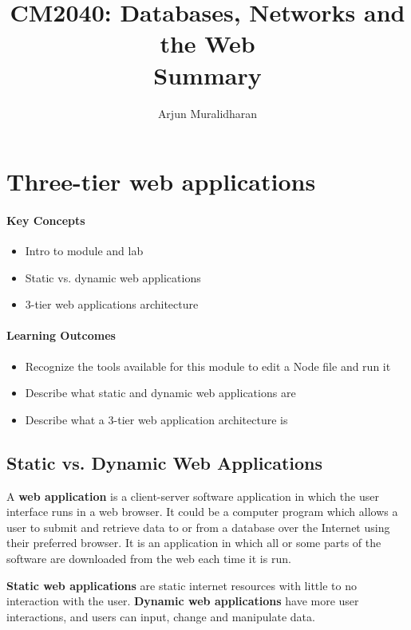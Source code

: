 
\title{CM2040: Databases, Networks and the Web \\ Summary}
\author{Arjun Muralidharan}



\section{Three-tier web applications}
\begin{mdframed}

\paragraph{Key Concepts}
\begin{itemize}[label={\checkmark}]
\item Intro to module and lab
\item Static vs. dynamic web applications
\item 3-tier web applications architecture
\end{itemize}

\paragraph{Learning Outcomes}
\begin{itemize}[label={\checkmark}]
\item Recognize the tools available for this module to edit a Node file and run it
\item Describe what static and dynamic web applications are
\item Describe what a 3-tier web application architecture is
\end{itemize}
\end{mdframed}
\subsection{Static vs. Dynamic Web Applications}
A \textbf{web application} is a client-server software application in which the user interface runs in a web browser. It could be a computer program which allows a user to submit and retrieve data to or from a database over the Internet using their preferred browser. It is an application in which all or some parts of the software are downloaded from the web each time it is run.

\textbf{Static web applications} are static internet resources with little to no interaction with the user. \textbf{Dynamic web applications} have more user interactions, and users can input, change and manipulate data. 

